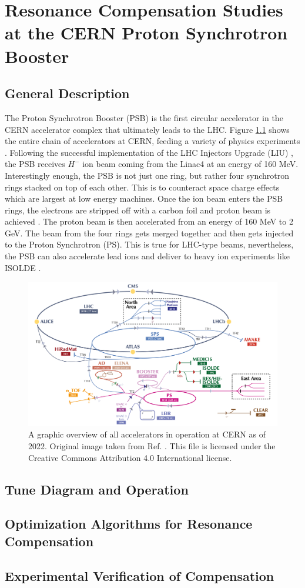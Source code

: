 \chapter{Resonance Compensation Studies at the CERN Proton Synchrotron Booster}
\label{sec:ch5}

\section{General Description}
The Proton Synchrotron Booster (PSB) is the first circular accelerator in the CERN accelerator complex that ultimately leads to the LHC. Figure \ref{fig:cernac} shows the entire chain of accelerators at CERN, feeding a variety of physics experiments \cite{cernplot}. Following the successful implementation of the LHC Injectors Upgrade (LIU) \cite{liu}, the PSB receives $H^-$ ion beam coming from the Linac4 at an energy of 160 MeV. Interestingly enough, the PSB is not just one ring, but rather four synchrotron rings stacked on top of each other. This is to counteract space charge effects which are largest at low energy machines. Once the ion beam enters the PSB rings, the electrons are stripped off with a carbon foil and proton beam is achieved \cite{psbstrip}. The proton beam is then accelerated from an energy of 160 MeV to 2 GeV. The beam from the four rings gets merged together and then gets injected to the Proton Synchrotron (PS). This is true for LHC-type beams, nevertheless, the PSB can also accelerate lead ions and deliver to heavy ion experiments like ISOLDE \cite{foteini1}.   \cite{foteini2} 

\begin{figure}[H]
    \centering
    \includegraphics[width=\linewidth]{chapter5/CERN_AC.png}
    \caption{A graphic overview of all accelerators in operation at CERN as of 2022. Original image taken from Ref. \cite{cernplot}. This file is licensed under the Creative Commons Attribution 4.0 International license.}
    \label{fig:cernac}
 \end{figure}

\section{Tune Diagram and Operation}

\section{Optimization Algorithms for Resonance Compensation}

\section{Experimental Verification of Compensation}
